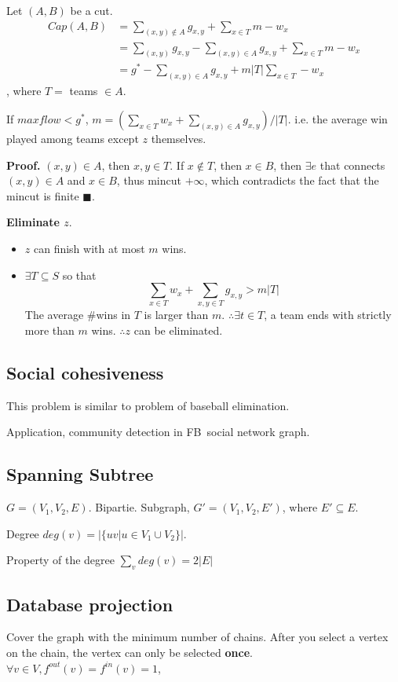 \documentclass[a4paper]{report}
\theoremstyle{definition}
\begin{document}
Let $(A, B)$ be a cut.
\begin{align*}
Cap(A, B) &= \sum_{(x,y)\notin A} g_{x,y}+\sum_{x\in T} m-w_x\\
&= \sum_{(x,y)}g_{x, y}-\sum_{(x, y)\in A} g_{x, y}+\sum_{x\in T}m-w_x\\
&= g^*-\sum_{(x, y)\in A} g_{x, y}+m|T|\sum_{x\in T}-w_x
\end{align*}
, where $T=$ teams $\in A$.

If $maxflow <g^*$, $m=(\sum_{x\in T} w_x+\sum_{(x,y)\in A} g_{x,y})/|T|$. i.e. the average win played among teams except $z$ themselves. 

\textbf{Proof.} $(x,y)\in A$, then $x, y\in T$. If $x \notin T$, then $x \in B$, then $\exists e$ that connects $(x,y)\in A$ and $x\in B$, thus mincut $+\infty$, which contradicts the fact that the mincut is finite $\blacksquare$. 

\textbf{Eliminate $z$}. 
\begin{itemize}
\item $z$ can finish with at most $m$ wins.
\item $\exists T\subseteq S$ so that
$$
\sum_{x\in T} w_x + \sum_{x, y \in T} g_{x, y} > m|T|
$$
The average \#wins in $T$ is larger than $m$. $\therefore \exists t \in T$, a team ends with strictly more than $m$ wins. $\therefore z$  can be eliminated.
\end{itemize}

\subsection{Social cohesiveness}
This problem is similar to problem of baseball elimination. 

Application, community detection in FB\ social network graph.

\subsection{Spanning Subtree}
$G=(V_1, V_2, E)$. Bipartie. Subgraph, $G'=(V_1, V_2, E')$, where $E'\subseteq E$.

Degree $deg(v)=|\{uv|u\in V_1\cup V_2\}|$. 

Property of the degree $\sum_v deg(v)=2|E|$

\subsection{Database projection}
Cover the graph with the minimum number of chains. After you select a vertex on the chain, the vertex can only be selected \textbf{once}. $\forall v\in V, f^{out}(v)=f^{in}(v)=1$, 
\end{document}
